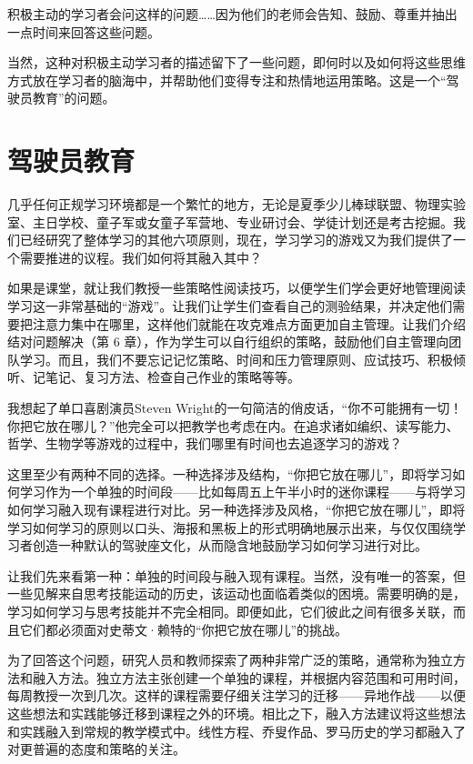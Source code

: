 积极主动的学习者会问这样的问题……因为他们的老师会告知、鼓励、尊重并抽出一点时间来回答这些问题。

当然，这种对积极主动学习者的描述留下了一些问题，即何时以及如何将这些思维方式放在学习者的脑海中，并帮助他们变得专注和热情地运用策略。这是一个“驾驶员教育”的问题。

\section*{驾驶员教育}

几乎任何正规学习环境都是一个繁忙的地方，无论是夏季少儿棒球联盟、物理实验室、主日学校、童子军或女童子军营地、专业研讨会、学徒计划还是考古挖掘。我们已经研究了整体学习的其他六项原则，现在，学习学习的游戏又为我们提供了一个需要推进的议程。我们如何将其融入其中？

如果是课堂，就让我们教授一些策略性阅读技巧，以便学生们学会更好地管理阅读学习这一非常基础的“游戏”。让我们让学生们查看自己的测验结果，并决定他们需要把注意力集中在哪里，这样他们就能在攻克难点方面更加自主管理。让我们介绍结对问题解决（第 6 章），作为学生可以自行组织的策略，鼓励他们自主管理向团队学习。而且，我们不要忘记记忆策略、时间和压力管理原则、应试技巧、积极倾听、记笔记、复习方法、检查自己作业的策略等等。

我想起了单口喜剧演员Steven Wright的一句简洁的俏皮话，“你不可能拥有一切！你把它放在哪儿？”他完全可以把教学也考虑在内。在追求诸如编织、读写能力、哲学、生物学等游戏的过程中，我们哪里有时间也去追逐学习的游戏？

这里至少有两种不同的选择。一种选择涉及结构，“你把它放在哪儿”，即将学习如何学习作为一个单独的时间段——比如每周五上午半小时的迷你课程——与将学习如何学习融入现有课程进行对比。另一种选择涉及风格，“你把它放在哪儿”，即将学习如何学习的原则以口头、海报和黑板上的形式明确地展示出来，与仅仅围绕学习者创造一种默认的驾驶座文化，从而隐含地鼓励学习如何学习进行对比。

让我们先来看第一种：单独的时间段与融入现有课程。当然，没有唯一的答案，但一些见解来自思考技能运动的历史，该运动也面临着类似的困境。需要明确的是，学习如何学习与思考技能并不完全相同。即便如此，它们彼此之间有很多关联，而且它们都必须面对史蒂文·赖特的“你把它放在哪儿”的挑战。

为了回答这个问题，研究人员和教师探索了两种非常广泛的策略，通常称为独立方法和融入方法。独立方法主张创建一个单独的课程，并根据内容范围和可用时间，每周教授一次到几次。这样的课程需要仔细关注学习的迁移——异地作战——以便这些想法和实践能够迁移到课程之外的环境。相比之下，融入方法建议将这些想法和实践融入到常规的教学模式中。线性方程、乔叟作品、罗马历史的学习都融入了对更普遍的态度和策略的关注。

